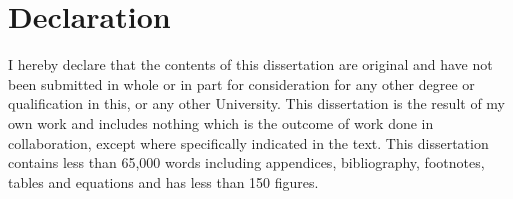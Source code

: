\chapter*{Declaration}


I hereby declare that the contents of this dissertation are original and have not been submitted in whole
or in part for consideration for any other degree or qualification in this,
or any other University. This dissertation is the result of my own work
and includes nothing which is the outcome of work done in collaboration,
except where specifically indicated in the text.
This dissertation contains less than 65,000 words including
appendices, bibliography, footnotes, tables and equations and has
less than 150 figures.
